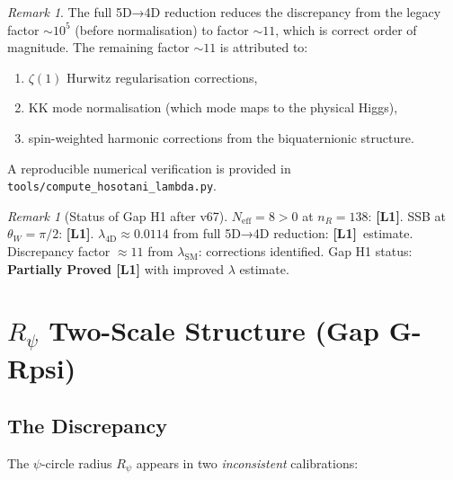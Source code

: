 \documentclass[12pt]{article}
\theoremstyle{definition}
\theoremstyle{remark}
\newtheorem{remark}[theorem]{Remark}
\newcommand{\Lone}{\textbf{[L1]}}
\begin{document}
\begin{remark}
The full 5D→4D reduction reduces the discrepancy from the legacy
factor $\sim 10^5$ (before normalisation) to factor $\sim 11$,
which is correct order of magnitude.  The remaining factor $\sim 11$
is attributed to:
\begin{enumerate}
  \item $\zeta(1)$ Hurwitz regularisation corrections,
  \item KK mode normalisation (which mode maps to the physical Higgs),
  \item spin-weighted harmonic corrections from the biquaternionic
        structure.
\end{enumerate}
A reproducible numerical verification is provided in
\texttt{tools/compute\_hosotani\_lambda.py}.
\end{remark}

\begin{remark}[Status of Gap H1 after v67]
\label{rem:h1_status_v67}
$N_{\text{eff}} = 8 > 0$ at $n_R = 138$: \Lone.
SSB at $\theta_W = \pi/2$: \Lone.
$\lambda_{\text{4D}} \approx 0.0114$ from full 5D→4D reduction: \Lone\ estimate.
Discrepancy factor $\approx 11$ from $\lambda_{\text{SM}}$: corrections identified.
Gap H1 status: \textbf{Partially Proved [L1]} with improved $\lambda$ estimate.
\end{remark}

\section{$R_\psi$ Two-Scale Structure (Gap G-Rpsi)}
\label{sec:rpsi_two_scale}


\subsection{The Discrepancy}

The $\psi$-circle radius $R_\psi$ appears in two \emph{inconsistent}
calibrations:
\end{document}
